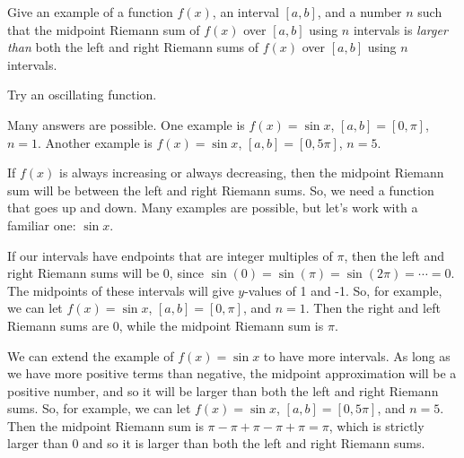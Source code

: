 \begin{question}\label{concept_int_b}
Give an example of a function $f(x)$, an interval $[a,b]$, and a number $n$ such that the midpoint Riemann sum of $f(x)$ over $[a,b]$ using $n$ intervals is \emph{larger than} both the left and right Riemann sums  of $f(x)$ over $[a,b]$ using $n$ intervals. %
\end{question}
\begin{hint}
Try an oscillating function.
\end{hint}
\begin{answer}
Many answers are possible. One example is $f(x)=\sin x$, $[a,b]=[0,\pi]$, $n=1$.
Another example is $f(x)=\sin x$, $[a,b]=[0,5\pi]$, $n=5$.
\end{answer}
\begin{solution}
If $f(x)$ is always increasing or always decreasing, then the midpoint Riemann sum will be between the left and right Riemann sums. So, we need a function that goes up and down. Many examples are possible, but let's work with a familiar one: $\sin x$.

If our intervals have endpoints that are integer multiples of $\pi$, then the left and right Riemann sums will be 0, since $\sin(0)=\sin(\pi)=\sin(2\pi)=\cdots=0$. The midpoints of these intervals will give $y$-values of 1 and -1. So, for example, we can let $f(x)=\sin x$, $[a,b]=[0,\pi]$, and $n=1$. Then the right and left Riemann sums are 0, while the midpoint Riemann sum is $\pi$.

We can extend the example of $f(x)=\sin x$ to have more intervals. As long as we have more positive terms than negative,  the midpoint approximation will be a positive number, and so it will be larger than both the left and right Riemann sums. So, for example, we can let $f(x)=\sin x$, $[a,b]=[0,5\pi]$, and $n=5$. Then the midpoint Riemann sum is $\pi-\pi+\pi-\pi+\pi=\pi$, which is strictly larger than 0 and so it is larger than both the left and right Riemann sums.

\begin{center}
\end{center}
\end{solution}

